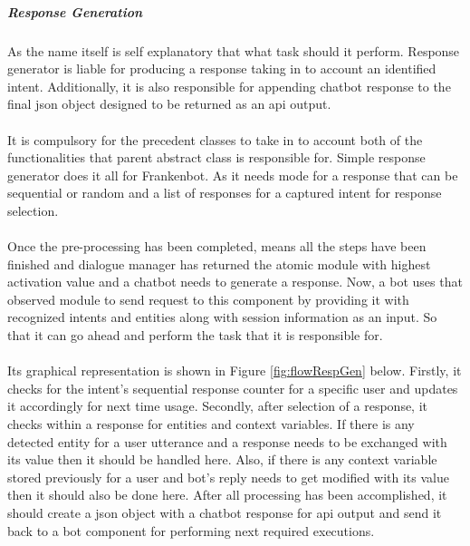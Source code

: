 \subparagraph*{Response Generation}
As the name itself is self explanatory that what task should it perform. Response generator is liable for producing a response taking in to account an identified intent. Additionally, it is also responsible for appending chatbot response to the final json object designed to be returned as an api output. 
\\~\\
It is compulsory for the precedent classes to take in to account both of the functionalities that parent abstract class is responsible for. Simple response generator does it all for Frankenbot. As it needs mode for a response that can be sequential or random and a list of responses for a captured intent for response selection.
\\~\\
Once the pre-processing has been completed, means all the steps have been finished and dialogue manager has returned the atomic module with highest activation value and a chatbot needs to generate a response. Now, a bot uses that observed module to send request to this component by providing it with recognized intents and entities along with session information as an input. So that it can go ahead and perform the task that it is responsible for. 
\\~\\
Its graphical representation is shown in Figure \ref{fig:flowRespGen} below. Firstly, it checks for the intent's sequential response counter for a specific user and updates it accordingly for next time usage. Secondly, after selection of a response, it checks within a response for entities and context variables. If there is any detected entity for a user utterance and a response needs to be exchanged with its value then it should be handled here. Also, if there is any context variable stored previously for a user and bot's reply needs to get modified with its value then it should also be done here. After all processing has been accomplished, it should create a json object with a chatbot response for api output and send it back to a bot component for performing next required executions. 

